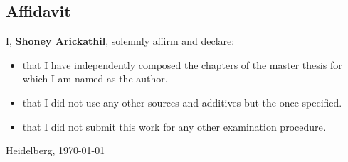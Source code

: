 
\begin{titlepage}
\section*{Affidavit}


I, \textbf{Shoney Arickathil}, solemnly affirm and declare:

\begin{itemize}
    \item that I have independently composed the chapters of the master thesis for which I am named as the author.
    \item that I did not use any other sources and additives but the once specified. 
    \item that I did not submit this work for any other examination procedure. 
\end{itemize}


\vspace*{5\baselineskip}

Heidelberg, \today \hspace*{1mm} \hrulefill

\end{titlepage}
